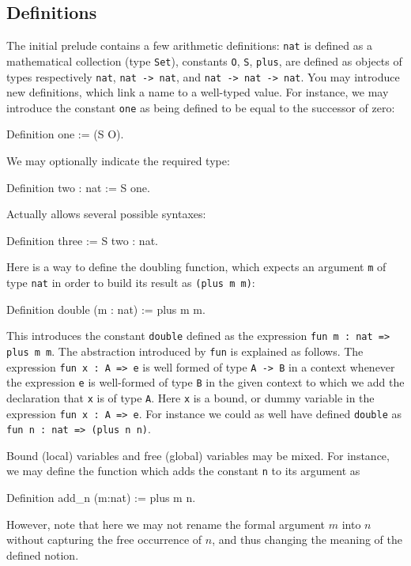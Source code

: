 \documentclass[11pt,a4paper]{book}
\begin{document}
\subsection{Definitions}

The initial prelude contains a few arithmetic definitions:
\texttt{nat} is defined as a mathematical collection (type \texttt{Set}),
constants \texttt{O}, \texttt{S}, \texttt{plus}, are defined as objects of
types respectively \texttt{nat}, \texttt{nat -> nat}, and \texttt{nat ->
nat -> nat}.
You may introduce new definitions, which link a name to a well-typed value.
For instance, we may introduce the constant \texttt{one} as being defined
to be equal to the successor of zero:
\begin{coq_example}
Definition one := (S O).
\end{coq_example}
We may optionally indicate the required type:
\begin{coq_example}
Definition two : nat := S one.
\end{coq_example}

Actually \Coq{} allows several possible syntaxes:
\begin{coq_example}
Definition three := S two : nat.
\end{coq_example}

Here is a way to define the doubling function, which expects an
argument \verb:m: of type \verb:nat: in order to build its result as
\verb:(plus m m)::

\begin{coq_example}
Definition double (m : nat) := plus m m.
\end{coq_example}
This introduces the constant \texttt{double} defined as the
expression \texttt{fun m : nat => plus m m}.
The abstraction introduced by \texttt{fun} is explained as follows.
The expression \texttt{fun x : A => e} is well formed of type
\texttt{A -> B} in a context whenever the expression \texttt{e} is
well-formed of type \texttt{B} in the given context to which we add the
declaration that \texttt{x} is of type \texttt{A}. Here \texttt{x} is a
bound, or dummy variable in the expression \texttt{fun x : A => e}.
For instance we could as well have defined \texttt{double} as
\texttt{fun n : nat => (plus n n)}.

Bound (local) variables and free (global) variables may be mixed.
For instance, we may define the function which adds the constant \verb:n:
to its argument as
\begin{coq_example}
Definition add_n (m:nat) := plus m n.
\end{coq_example}
However, note that here we may not rename the formal argument $m$ into $n$
without capturing the free occurrence of $n$, and thus changing the meaning
of the defined notion.
\end{document}
